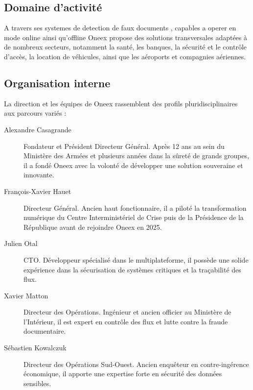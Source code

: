 \subsection{Domaine d'activité}

A travers ses systemes de detection de faux documents , capables a operer en mode online ainsi qu'offline Oneex propose des solutions transversales adaptées à de nombreux secteurs, notamment la santé, les banques, la sécurité et le contrôle d’accès, la location de véhicules, ainsi que les aéroports et compagnies aériennes.

\subsection{Organisation interne}

La direction et les équipes de Oneex rassemblent des profils pluridisciplinaires aux parcours variés :

\begin{description}
	\item[Alexandre Casagrande] Fondateur et Président Directeur Général. Après 12 ans au sein du Ministère des Armées et plusieurs années dans la sûreté de grands groupes, il a fondé Oneex avec la volonté de développer une solution souveraine et innovante.

	\item[François-Xavier Hauet] Directeur Général. Ancien haut fonctionnaire, il a piloté la transformation numérique du Centre Interministériel de Crise puis de la Présidence de la République avant de rejoindre Oneex en 2025.

	\item[Julien Otal] CTO. Développeur spécialisé dans le multiplateforme, il possède une solide expérience dans la sécurisation de systèmes critiques et la traçabilité des flux.

	\item[Xavier Matton] Directeur des Opérations. Ingénieur et ancien officier au Ministère de l’Intérieur, il est expert en contrôle des flux et lutte contre la fraude documentaire.


	\item[Sébastien Kowalczuk] Directeur des Opérations Sud-Ouest. Ancien enquêteur en contre-ingérence économique, il apporte une expertise forte en sécurité des données sensibles.
\end{description}

